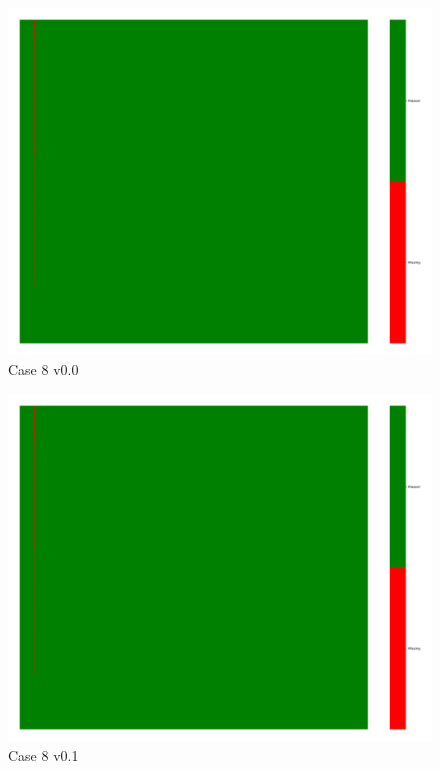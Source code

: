 \documentclass[a4paper,12pt]{article}
\begin{document}
\begin{figure}[H]
    \includegraphics[width=\linewidth]{case9_v0.0_heatmap_cleaned.png}
    \caption*{Case 8 v0.0}
\end{figure}

\begin{figure}[H]
    \includegraphics[width=\linewidth]{case9_v0.1_heatmap_cleaned.png}
    \caption*{Case 8 v0.1}
\end{figure}
\end{document}
